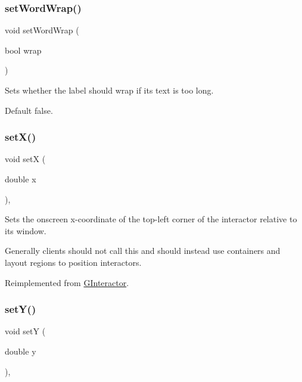 \subsubsection{\texorpdfstring{set\+Word\+Wrap()}{setWordWrap()}}
{\footnotesize\ttfamily void set\+Word\+Wrap (\begin{DoxyParamCaption}\item[{bool}]{wrap }\end{DoxyParamCaption})\hspace{0.3cm}{\ttfamily [virtual]}}



Sets whether the label should wrap if its text is too long. 

Default false. \mbox{\label{classsgl_1_1GLabel_a173837ba805eaa2411e88834869d3a9c}} 
\subsubsection{\texorpdfstring{set\+X()}{setX()}}
{\footnotesize\ttfamily void setX (\begin{DoxyParamCaption}\item[{double}]{x }\end{DoxyParamCaption})\hspace{0.3cm}{\ttfamily [override]}, {\ttfamily [virtual]}}



Sets the onscreen x-\/coordinate of the top-\/left corner of the interactor relative to its window. 

Generally clients should not call this and should instead use containers and layout regions to position interactors. 

Reimplemented from \mbox{\hyperlink{classsgl_1_1GInteractor_a9c18fcc579333bf9653d13ad2b372e39}{G\+Interactor}}.

\mbox{\label{classsgl_1_1GLabel_a0b738606c7aca5c472b66c4e55b3c685}} 
\subsubsection{\texorpdfstring{set\+Y()}{setY()}}
{\footnotesize\ttfamily void setY (\begin{DoxyParamCaption}\item[{double}]{y }\end{DoxyParamCaption})\hspace{0.3cm}{\ttfamily [override]}, {\ttfamily [virtual]}}



